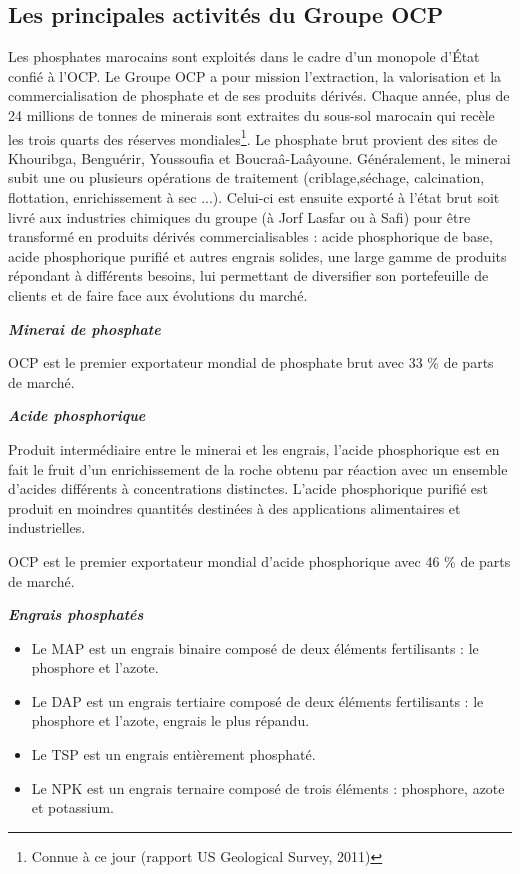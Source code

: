 	\subsection{Les principales activités du Groupe OCP}
	Les phosphates marocains sont exploités dans le cadre d'un monopole d'État confié à l'OCP.
	Le Groupe OCP a pour mission l'extraction, la valorisation et la commercialisation de
	phosphate et de ses produits dérivés. Chaque année, plus de 24 millions de tonnes de minerais
	sont extraites du sous-sol marocain qui recèle les trois quarts des réserves mondiales\footnote{Connue à ce jour (rapport US Geological Survey, 2011)}. Le phosphate brut provient des sites de Khouribga, Benguérir, Youssoufia et Boucraâ-Laâyoune. Généralement, le minerai subit une ou plusieurs opérations de traitement (criblage,séchage, calcination, flottation, enrichissement à sec ...). Celui-ci est ensuite exporté à l'état brut soit livré aux industries chimiques du groupe (à Jorf Lasfar ou à Safi) pour être transformé en produits dérivés commercialisables : acide phosphorique de base, acide phosphorique purifié et autres engrais solides, une large gamme de produits répondant à différents besoins, lui permettant de diversifier son portefeuille de clients
	et de faire face aux évolutions du marché\cite{NACER}.
		\par
		\textit{\textbf{Minerai de phosphate}}
		\par
		OCP est le premier exportateur mondial de phosphate brut avec 33 \% de parts de marché.
		\par
		\textit{\textbf{Acide phosphorique}} \par
		Produit intermédiaire entre le minerai et les engrais, l’acide phosphorique est en fait le fruit
		d’un enrichissement de la roche obtenu par réaction avec un ensemble d’acides différents à
		concentrations distinctes. L’acide phosphorique purifié est produit en moindres quantités destinées à des applications alimentaires et industrielles.\par OCP est le premier exportateur mondial d’acide phosphorique avec 46 \% de parts de marché.
		\par
			\textit{\textbf{Engrais phosphatés}} \par
		\begin{itemize}
		\item Le MAP est un engrais binaire composé de deux éléments fertilisants : le phosphore et l’azote.
		\item Le DAP est un engrais tertiaire composé de deux éléments fertilisants : le phosphore et l’azote, engrais le plus répandu.
		\item Le TSP est un engrais entièrement phosphaté.
		\item Le NPK est un engrais ternaire composé de trois éléments : phosphore, azote et potassium.
		\end{itemize}
